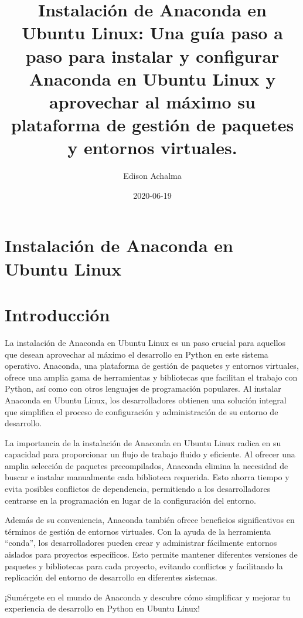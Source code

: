 \documentclass[
  jou,
  floatsintext,
  longtable,
  a4paper,
  nolmodern,
  notxfonts,
  notimes,
  colorlinks=true,linkcolor=blue,citecolor=blue,urlcolor=blue]{apa7}
\title{Instalación de Anaconda en Ubuntu Linux: Una guía paso a paso
para instalar y configurar Anaconda en Ubuntu Linux y aprovechar al
máximo su plataforma de gestión de paquetes y entornos virtuales.}
\author{Edison Achalma}
\affiliation{
{Escuela Profesional de Economía, Universidad Nacional de San Cristóbal
de Huamanga}}
\date{2020-06-19}
\begin{document}
\maketitle

\hypertarget{toc}{}
\tableofcontents
\newpage
\section[Introduction]{Instalación de Anaconda en Ubuntu Linux}

\setcounter{secnumdepth}{-\maxdimen} %

\setlength\LTleft{0pt}


\section{Introducción}\label{introducciuxf3n}

La instalación de Anaconda en Ubuntu Linux es un paso crucial para
aquellos que desean aprovechar al máximo el desarrollo en Python en este
sistema operativo. Anaconda, una plataforma de gestión de paquetes y
entornos virtuales, ofrece una amplia gama de herramientas y bibliotecas
que facilitan el trabajo con Python, así como con otros lenguajes de
programación populares. Al instalar Anaconda en Ubuntu Linux, los
desarrolladores obtienen una solución integral que simplifica el proceso
de configuración y administración de su entorno de desarrollo.

La importancia de la instalación de Anaconda en Ubuntu Linux radica en
su capacidad para proporcionar un flujo de trabajo fluido y eficiente.
Al ofrecer una amplia selección de paquetes precompilados, Anaconda
elimina la necesidad de buscar e instalar manualmente cada biblioteca
requerida. Esto ahorra tiempo y evita posibles conflictos de
dependencia, permitiendo a los desarrolladores centrarse en la
programación en lugar de la configuración del entorno.

Además de su conveniencia, Anaconda también ofrece beneficios
significativos en términos de gestión de entornos virtuales. Con la
ayuda de la herramienta ``conda'', los desarrolladores pueden crear y
administrar fácilmente entornos aislados para proyectos específicos.
Esto permite mantener diferentes versiones de paquetes y bibliotecas
para cada proyecto, evitando conflictos y facilitando la replicación del
entorno de desarrollo en diferentes sistemas.

¡Sumérgete en el mundo de Anaconda y descubre cómo simplificar y mejorar
tu experiencia de desarrollo en Python en Ubuntu Linux!
\end{document}
